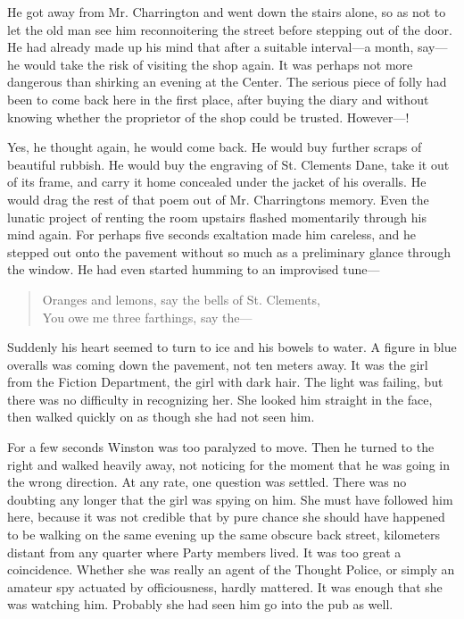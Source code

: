 He got away from Mr. Charrington and went down the stairs alone, so as
not to let the old man see him reconnoitering the street before stepping
out of the door. He had already made up his mind that after a suitable
interval---a month, say---he would take the risk of visiting the shop
again. It was perhaps not more dangerous than shirking an evening at the
Center. The serious piece of folly had been to come back here in the
first place, after buying the diary and without knowing whether the
proprietor of the shop could be trusted. However---!

Yes, he thought again, he would come back. He would buy further scraps
of beautiful rubbish. He would buy the engraving of St.
Clement\textquotesingle s Dane, take it out of its frame, and carry it
home concealed under the jacket of his overalls. He would drag the rest
of that poem out of Mr. Charrington\textquotesingle s memory. Even the
lunatic project of renting the room upstairs flashed momentarily through
his mind again. For perhaps five seconds exaltation made him careless,
and he stepped out onto the pavement without so much as a preliminary
glance through the window. He had even started humming to an improvised
tune---

\begin{quotation}
\noindent Oranges and lemons, say the bells of St.
Clement\textquotesingle s,\\
You owe me three farthings, say the---\\
\end{quotation}

Suddenly his heart seemed to turn to ice and his bowels to water. A
figure in blue overalls was coming down the pavement, not ten meters
away. It was the girl from the Fiction Department, the girl with dark
hair. The light was failing, but there was no difficulty in recognizing
her. She looked him straight in the face, then walked quickly on as
though she had not seen him.

For a few seconds Winston was too paralyzed to move. Then he turned to
the right and walked heavily away, not noticing for the moment that he
was going in the wrong direction. At any rate, one question was settled.
There was no doubting any longer that the girl was spying on him. She
must have followed him here, because it was not credible that by pure
chance she should have happened to be walking on the same evening up the
same obscure back street, kilometers distant from any quarter where
Party members lived. It was too great a coincidence. Whether she was
really an agent of the Thought Police, or simply an amateur spy actuated
by officiousness, hardly mattered. It was enough that she was watching
him. Probably she had seen him go into the pub as well.

